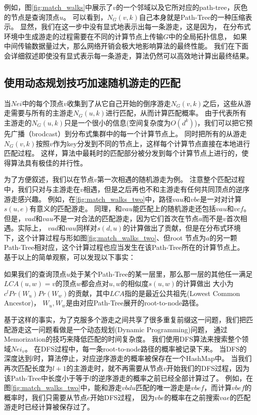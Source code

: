 \documentclass[master]{njuthesis}
\begin{document}
例如，图\ref{fig:match_walks}中展示了$v$的一个邻域以及它所对应的path-tree，灰色的节点是查询顶点$u$。
可以看到，$N_{G}(v, k)$自己本身就是Path-Tree的一种压缩表示。
显然，我们在这一步中没有显式地表示出每一条游走，这是因为，
在分布式环境中生成游走的过程需要在不同的计算节点上传输$G$中的全局拓扑信息，
如果中间传输数据量过大，那么网络开销会极大地影响算法的最终性能。
我们在下面会详细叙述即使没有显式表示每一条游走，算法仍然可以高效地计算出最终结果。

\subsection{使用动态规划技巧加速随机游走的匹配}
当$Nei$中的每个顶点$v$收集到了从它自己开始的倒序游走$N_{G}(v, k)$之后，这些从游走需要与所有的主游走$N_{G}(u, k)$进行匹配，从而计算匹配概率。
由于代表所有主游走的$N_{G}(u, k)$只是一个很小的信息(空间复杂度为$O(d^k)$)，我们可以把它预先广播（brodcast）到分布式集群中的每一个计算节点上。
同时把所有的从游走$N_{G}(v, k)$按照$v$作为key分发到不同的节点上，这样每个计算节点直接在本地进行匹配过程。
这样，算法中最耗时的匹配部分被分发到每个计算节点上进行的，使得算法具有极佳的并行性。

为了方便叙述，我们以在节点$v$第一次相遇的随机游走为例。
注意整个匹配过程中，我们只对与主游走在$v$相遇，但是之后再也不和主游走有任何共同顶点的逆序游走感兴趣。
例如，在\ref{fig:match_walks_two}中，路径$vau$和$vbe$是一对对计算$s(u,e)$有意义的匹配游走。
同理，和$vau$能匹配上的随机游走还包括$vau$和$vcf$。
但是，$vad$和$vau$不是一对合法的匹配游走，因为它们首次在节点$a$而不是$v$首次相遇。实际上，
$vad$和$vau$同样对$s(d,u)$的计算做出了贡献，但是在分布式环境下，这个计算过程与形如图\ref{fig:match_walks_two}、但root
节点为$a$的另一颗Path-Tree相对应，这个计算过程也应当发生在该Path-Tree所在的计算节点上。
基于以上的简单观察，可以发现以下事实：
\begin{fact}
如果我们的查询顶点$u$处于某个Path-Tree的某一层里，那么那一层的其他任一满足$LCA(u, w)=v$的顶点$w$都会点对$u,w$的相似度$s(u,w)$的计算做出
大小为$c^{l}Pr(W_u)Pr(W_w)$的贡献，其中$LCA$指的是最近公共祖先(Lowest Common Ancestor)，
$W_u, W_w$是由对应Path-Tree展开的root-to-node路径。
\end{fact}
基于这样的事实，为了克服多个游走之间共享了很多重复前缀这一问题，我们把匹配游走这一问题看做是一个动态规划(Dynamic Programming)问题，
通过Memorization的技巧来降低匹配的时间复杂度。
我们使用DFS算法来搜索整个领域$Nei_v$。
在DFS过程中，每一条root-to-node路径的概率被记录下来。
当DFS的深度达到$l$时，算法停止，对应逆序游走的概率被保存在一个HashMap中。
当我们再次匹配长度为$l+1$的主游走时，就不再需要从节点$v$开始我们的DFS过程，因为该Path-Tree中长度小于等于$l$的逆序游走的概率之前已经全部计算过了。
例如，在图\ref{fig:match_walks_two}中，能和游走$vbdu$匹配的唯一游走是$vbef$，而计算$vbef$的概率时，我们只需要从节点$e$开始DFS过程，
因为$vbe$的概率在之前搜索$vae$的匹配游走时已经计算被保存过了。
\end{document}
